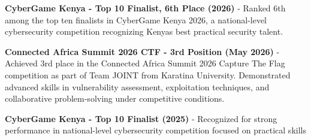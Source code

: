 \documentclass[]{resume-format}
\begin{document}
\vspace{0.5mm}
\begin{cvachievements}
\setlength{\itemsep}{0mm}
  \item { \textbf{ CyberGame Kenya - Top 10 Finalist, 6th Place (2026) } - Ranked 6th among the top ten finalists in CyberGame Kenya 2026, a national-level cybersecurity competition recognizing Kenya\textquotesingle{}s best practical security talent. }
  \item { \textbf{ Connected Africa Summit 2026 CTF - 3rd Position (May 2026) } - Achieved 3rd place in the Connected Africa Summit 2026 Capture The Flag competition as part of Team JOINT from Karatina University. Demonstrated advanced skills in vulnerability assessment, exploitation techniques, and collaborative problem-solving under competitive conditions. }
  \item { \textbf{ CyberGame Kenya - Top 10 Finalist (2025) } - Recognized for strong performance in national-level cybersecurity competition focused on practical skills }
\end{cvachievements}


\end{document}
